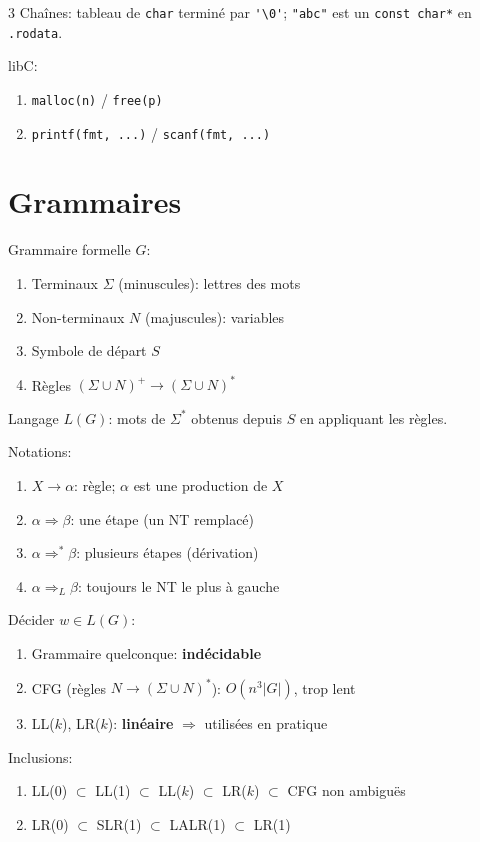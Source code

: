 \documentclass[12pt, a4paper]{article}
\begin{document}
\begin{multicols*}{3}
	Chaînes: tableau de \lstinline|char| terminé par \lstinline|'\0'|; \lstinline|"abc"| est un \lstinline|const char*| en \lstinline|.rodata|.

	libC:
	\begin{enumerate}[\roman*.]
		\item \lstinline|malloc(n)| / \lstinline|free(p)|
		\item \lstinline|printf(fmt, ...)| / \lstinline|scanf(fmt, ...)|
	\end{enumerate}
	\vspace{-1em}
	\colbreak
  \section{Grammaires}
	Grammaire formelle $G$:
	\begin{enumerate}[\roman*.]
		\item Terminaux $\Sigma$ (minuscules): lettres des mots
		\item Non-terminaux $N$ (majuscules): variables
		\item Symbole de départ $S$
		\item Règles $(\Sigma\cup N)^+\rightarrow(\Sigma\cup N)^*$
	\end{enumerate}
	Langage $L(G)$: mots de $\Sigma^*$ obtenus depuis $S$ en appliquant les règles.
 
	Notations:
	\begin{enumerate}[\roman*.]
		\item $X\rightarrow\alpha$: règle; $\alpha$ est une production de $X$
		\item $\alpha\Rightarrow\beta$: une étape (un NT remplacé)
		\item $\alpha\Rightarrow^*\beta$: plusieurs étapes (dérivation)
		\item $\alpha\Rightarrow_L\beta$: toujours le NT le plus à gauche
	\end{enumerate}
 
	Décider $w\in L(G)$:
	\begin{enumerate}[\roman*.]
		\item Grammaire quelconque: \textbf{indécidable}
		\item CFG (règles $N\rightarrow(\Sigma\cup N)^*$): $O(n^3|G|)$, trop lent
		\item LL($k$), LR($k$): \textbf{linéaire} $\Rightarrow$ utilisées en pratique
	\end{enumerate}
 
	Inclusions:
	\begin{enumerate}[\roman*.]
		\item LL(0) $\subset$ LL(1) $\subset$ LL($k$) $\subset$ LR($k$) $\subset$ CFG non ambiguës
		\item LR(0) $\subset$ SLR(1) $\subset$ LALR(1) $\subset$ LR(1)
	\end{enumerate}
 

\end{multicols*}
\end{document}
